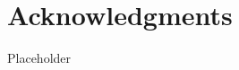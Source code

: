 \documentclass[11pt,letterpaper]{article}
\theoremstyle{definition} %
\begin{document}
\clearpage
\section*{Acknowledgments}\label{sec:acknowledgements}
Placeholder

\printbibliography
\end{document}
